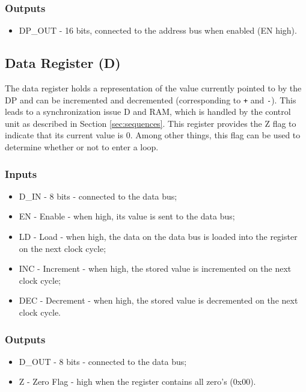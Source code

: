 \subsubsection*{Outputs}
\begin{itemize}
\itemsep0em   
\item DP\_OUT - 16 bits, connected to the address bus when enabled (EN high).
\end{itemize}

\subsection{Data Register (D)} \label{sec:architecture:d}
The data register holds a representation of the value currently pointed to by the DP and can be incremented and decremented (corresponding to \texttt{+} and \texttt{-}). This leads to a synchronization issue D and RAM, which is handled by the control unit as described in Section \ref{sec:sequences}. This register provides the Z flag to indicate that its current value is 0. Among other things, this flag can be used to determine whether or not to enter a loop.

\subsubsection*{Inputs}
\begin{itemize}
\itemsep0em   
\item D\_IN - 8 bits - connected to the data bus;
\item EN - Enable - when high, its value is sent to the data bus;
\item LD - Load - when high, the data on the data bus is loaded into the register on the next clock cycle;
\item INC - Increment - when high, the stored value is incremented on the next clock cycle;
\item DEC - Decrement - when high, the stored value is decremented on the next clock cycle.
\end{itemize}

\subsubsection*{Outputs}
\begin{itemize}
\itemsep0em 
\item D\_OUT - 8 bits - connected to the data bus;
\item Z - Zero Flag - high when the register contains all zero's (0x00).
\end{itemize}


